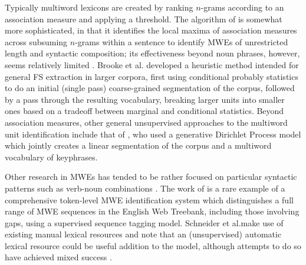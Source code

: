 \documentclass[11pt,letterpaper]{article}
\makeatletter
\def \al {al.\@ }
\makeatother
\begin{document}
Typically multiword lexicons are created by ranking $n$-grams according to an association measure and applying a threshold. The algorithm of  is somewhat more sophisticated, in that it identifies the local maxima of association measures across subsuming $n$-grams within a sentence to identify MWEs of unrestricted length and syntactic composition; its effectiveness beyond noun phrases, however, seems relatively limited \cite{Ramisch12}. Brooke et \al {} developed a heuristic method intended for general FS extraction in larger corpora, first using conditional probably statistics to do an initial (single pass) coarse-grained segmentation of the corpus, followed by a pass through the resulting vocabulary, breaking larger units into smaller ones based on a tradeoff between marginal and conditional statistics. Beyond association measures, other general unsupervised approaches to the multiword unit identification include that of , who used a generative Dirichlet Process model which jointly creates a linear segmentation of the corpus and a multiword vocabulary of keyphrases.

Other research in MWEs has tended to be rather focused on particular syntactic patterns such as verb-noun combinations \cite{Fazly09}. The work of  is a rare example of a comprehensive token-level MWE identification system which distinguishes a full range of MWE sequences in the English Web Treebank, including those involving gaps, using a supervised sequence tagging model. Schneider et \al make use of existing manual lexical resources and note that an (unsupervised) automatic lexical resource could be useful addition to the model, although attempts to do so have achieved mixed success \cite{Riedl16}. 
\end{document}
